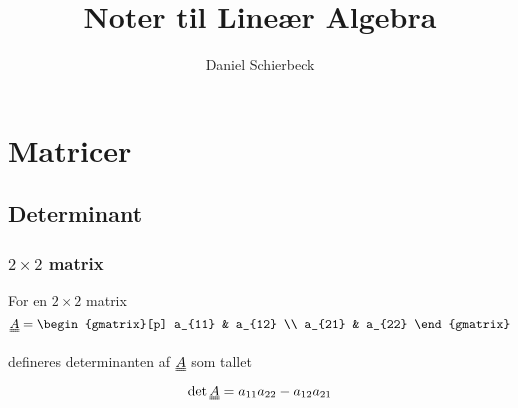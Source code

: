 \documentclass[a4paper]{article}
\title{Noter til Lineær Algebra}
\author{Daniel Schierbeck}
\newcommand{\mtx}[1]{\uuline{#1}}
\begin{document}
\maketitle

\section{Matricer}

\subsection{Determinant}

\subsubsection{$2 \times 2$ matrix}

For en $2 \times 2$ matrix
$$
\mtx{A} =
\begin{gmatrix}[p]
    a_{11} & a_{12} \\
    a_{21} & a_{22}
\end{gmatrix}
$$

defineres determinanten af $\mtx{A}$ som tallet
$$
\det{\mtx{A}} = a_{11}a_{22} - a_{12}a_{21}
$$
\end{document}
